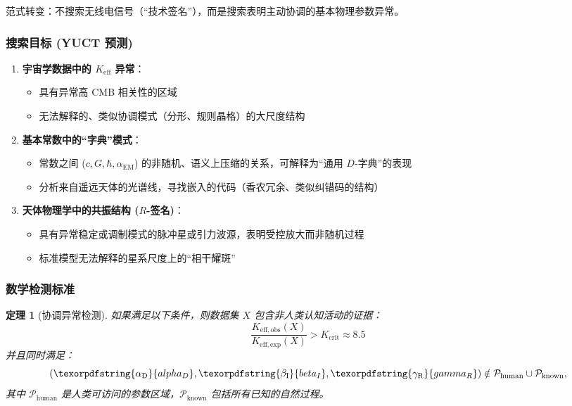 \documentclass[11pt,a4paper]{article}
\newtheorem{theorem}{定理}
\DeclareRobustCommand{\alD}{\texorpdfstring{\ensuremath{\alpha_{\mathrm{D}}}}{alpha_D}}
\DeclareRobustCommand{\beI}{\texorpdfstring{\ensuremath{\beta_{\mathrm{I}}}}{beta_I}}
\DeclareRobustCommand{\gaR}{\texorpdfstring{\ensuremath{\gamma_{\mathrm{R}}}}{gamma_R}}
\newcommand{\eff}{\mathrm{eff}}
\newcommand{\Ke}{K_{\eff}}
\newcommand{\Keobs}{K_{\eff,\mathrm{obs}}}
\newcommand{\Keexp}{K_{\eff,\mathrm{exp}}}
\newcommand{\Kcrit}{K_{\mathrm{crit}}}
\begin{document}
	范式转变：不搜索无线电信号（“技术签名”），而是搜索表明主动协调的基本物理参数异常。
	
	\subsubsection{搜索目标 (YUCT 预测)}
	
	\begin{enumerate}
		\item \textbf{宇宙学数据中的 \(\Ke\) 异常}：
		\begin{itemize}
			\item 具有异常高 CMB 相关性的区域
			\item 无法解释的、类似协调模式（分形、规则晶格）的大尺度结构
		\end{itemize}
		
		\item \textbf{基本常数中的“字典”模式}：
		\begin{itemize}
			\item 常数之间 (\(c, G, \hbar, \alpha_{\mathrm{EM}}\)) 的非随机、语义上压缩的关系，可解释为“通用 \(D\)-字典”的表现
			\item 分析来自遥远天体的光谱线，寻找嵌入的代码（香农冗余、类似纠错码的结构）
		\end{itemize}
		
		\item \textbf{天体物理学中的共振结构 (\(R\)-签名)}：
		\begin{itemize}
			\item 具有异常稳定或调制模式的脉冲星或引力波源，表明受控放大而非随机过程
			\item 标准模型无法解释的星系尺度上的“相干耀斑”
		\end{itemize}
	\end{enumerate}
	
	\subsubsection{数学检测标准}
	
	\begin{theorem}[协调异常检测]
		如果满足以下条件，则数据集 \(X\) 包含非人类认知活动的证据：
		\[
		\frac{\Keobs(X)}{\Keexp(X)} > \Kcrit \approx 8.5
		\]
		并且同时满足：
		\[
		(\alD, \beI, \gaR) \notin \mathcal{P}_{\mathrm{human}} \cup \mathcal{P}_{\mathrm{known}},
		\]
		其中 \(\mathcal{P}_{\mathrm{human}}\) 是人类可访问的参数区域，\(\mathcal{P}_{\mathrm{known}}\) 包括所有已知的自然过程。
	\end{theorem}
	
\end{document}
